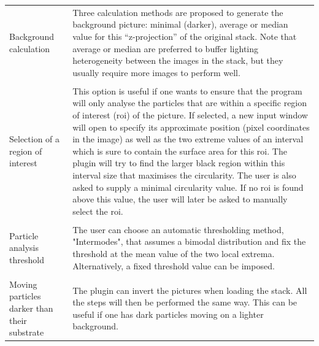 \begin{longtable}{
	p{}%
 	p{}}
Background calculation & Three calculation methods are proposed to generate the
background picture: minimal (darker), average or median value for this
“z-projection” of the original stack. Note that average or median are preferred
to buffer lighting heterogeneity between the images in the stack, but they
usually require more images to perform well.\\
\hspace{1cm} &\\
Selection of a region of interest & This option is useful if one wants to ensure
that the program will only analyse the particles that are within a specific
region of interest (roi) of the picture. If selected, a new input window will
open to specify its approximate position (pixel coordinates in the image) as
well as the two extreme values of an interval which is sure to contain the
surface area for this roi. The plugin will try to find the larger black region
within this interval size that maximises the circularity. The user is also asked
to supply a minimal circularity value. If no roi is found above this value, the
user will later be asked to manually select the roi.\\
\hspace{1cm} &\\
Particle analysis threshold & The user can choose an automatic thresholding
method, "Intermodes", that assumes a bimodal distribution and fix the threshold
at the mean value of the two local extrema. Alternatively, a fixed threshold
value can be imposed.\\
\hspace{1cm} &\\
Moving particles darker than their substrate & The plugin can invert the
pictures when loading the stack. All the steps will then be performed the same
way. This can be useful if one has dark particles moving on a lighter
background.\\

\end{longtable}
\newpage

